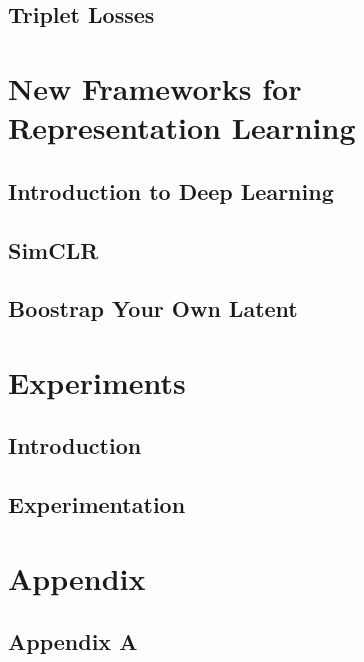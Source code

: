 \documentclass[oneside,openright,titlepage,numbers=noenddot,openany,headinclude,footinclude=true, cleardoublepage=empty,abstractoff,BCOR=5mm,paper=a4,fontsize=11pt, dvipsnames]{scrreprt}
\begin{document}
\chapter{Triplet Losses}

\clearpage

\part{New Frameworks for Representation Learning}
\chapter{Introduction to Deep Learning}

\chapter{SimCLR}

\chapter{Boostrap Your Own Latent}


\part{Experiments}
\chapter{Introduction}

\chapter{Experimentation}



\part{Appendix}
\chapter{Appendix A}




\nocite{*}


\end{document}
